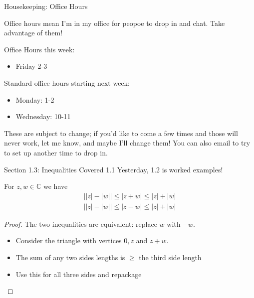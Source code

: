 \documentclass{beamer}
\newcommand{\C}{\mathbb{C}}
\begin{document}
  \begin{frame}{Housekeeping: Office Hours}

Office hours mean I'm in my office for peopoe to drop in and chat.  Take advantage of them!

\begin{block}{Office Hours this week:}
\begin{itemize}
    \item Friday 2-3
\end{itemize}
\end{block}
  
\begin{block}{Standard office hours starting next week:}
\begin{itemize}
    \item Monday: 1-2
    \item Wednesday: 10-11
\end{itemize}
These are subject to change; if you'd like to come a few times and those will never work, let me know, and maybe I'll change them!  You can also email to try to set up another time to drop in.
\end{block}
\end{frame}


\begin{frame}{Section 1.3: Inequalities}
Covered 1.1 Yesterday, 1.2 is worked examples!
\begin{lemma}For $z,w\in\C$ we have
\begin{eqnarray*}
\big| |z|-|w|\big| \leq |z+w| \leq |z|+|w| \\
\big| |z|-|w|\big| \leq |z-w| \leq |z|+|w| 
\end{eqnarray*}

\end{lemma}
 \begin{proof}
 The two inequalities are equivalent:  replace $w$ with $-w$.
 \begin{itemize}
     \item Consider the triangle with vertices $0, z$ and $z+w$.
     \item The sum of any two sides lengths is $\geq$ the third side length  
     \item Use this for all three sides and repackage 
\end{itemize}
 \end{proof}
  \end{frame}
\end{document}
